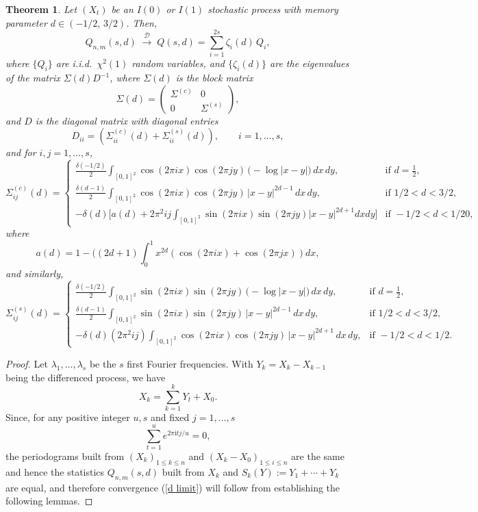 \documentclass[12pt]{article}
\newtheorem{thm}{Theorem}
\def\i{\mathrm{i}}
\begin{document}
 \begin{thm}\label{Th1}
Let $(X_t)$ be an $I(0)$ or $I(1)$ stochastic process with memory parameter $d \in (-1/2,\,3/2)$. Then,
\begin{equation}\label{d limit}
Q_{n,m}(s,d) \;\overset{\mathcal{D}}{\longrightarrow}\;
Q(s,d) = \sum_{i=1}^{2s} \zeta_i(d)\, Q_i, 
\end{equation}
where $\{Q_i\}$ are i.i.d.\ $\chi^2(1)$ random variables, and $\{\zeta_i(d)\}$ are the eigenvalues of the  matrix
$\Sigma(d)D^{-1}$, where $\Sigma(d)$ is the block matrix
\begin{equation}\label{Sigma}
\Sigma(d) =
\begin{pmatrix}
\Sigma^{(c)} & 0\\[3pt]
0 &\Sigma^{(s)}
\end{pmatrix},
\end{equation}
and $D$ is the diagonal matrix with diagonal entries
$$D_{ii} =\left(\Sigma^{(c)}_{ii}(d) + \Sigma^{(s)}_{ii}(d)\right),\qquad i=1,\ldots,s,$$
and for $i,j=1,\ldots,s$, 
\[
\Sigma^{(c)}_{ij}(d) =
\begin{cases}
\displaystyle \frac{\delta(-1/2)}{2}\int_{[0,1]^2}\!\cos(2\pi i x)\cos(2\pi j y)\,
\bigl(-\log|x-y|\bigr)\,dx\,dy,
& \text{if } d=\tfrac{1}{2},\\[10pt]
\displaystyle\frac{\delta(d-1)}{2}\int_{[0,1]^2}\!\cos(2\pi i x)\cos(2\pi j y)\,
|x-y|^{2d-1}\,dx\,dy,
& \text{if } 1/2<d<3/2,\\[10pt]
-\delta(d)\Bigg[a(d)+
2\pi^2 i j\displaystyle\int_{[0,1]^2}\sin(2\pi ix)\sin(2\pi jy)\vert x- y\vert^{2d+1}dxdy\Bigg] 
& \text{if } -1/2<d<1/20,
\end{cases}
\]
where
$$
a(d)=1-((2d+1)\int_0^1x^{2d}\left(\cos(2\pi ix)+\cos(2\pi jx)\right)dx,
$$
and similarly,
\[
\Sigma^{(s)}_{ij}(d) =
\begin{cases}
\displaystyle\frac{\delta(-1/2)}{2} \int_{[0,1]^2}\!\sin(2\pi i x)\sin(2\pi j y)\,
\bigl(-\log|x-y|\bigr)\,dx\,dy,
& \text{if } d=\tfrac{1}{2},\\[10pt]
\frac{\delta(d-1)}{2}\displaystyle\int_{[0,1]^2}\!\sin(2\pi i x)\sin(2\pi j y)\,
|x-y|^{2d-1}\,dx\,dy,
& \text{if } 1/2<d<3/2,\\[10pt]
-\delta(d)(2\pi^2 ij)\displaystyle\int_{[0,1]^2}\!\cos(2\pi i x)\cos(2\pi j y)\,
|x-y|^{2d+1}\,dx\,dy,
& \text{if } -1/2<d<1/2.
\end{cases}
\]
\end{thm}
\begin{proof}
    

Let $\lambda_1,\ldots,\lambda_s$ be the $s$ first  Fourier frequencies. 
With $Y_k=X_k-X_{k-1}$ being the differenced process, we have
$$
X_k=\sum_{k=1}^kY_t+X_0.
$$
Since, for any positive integer $u,s$ and fixed $j=1,\ldots,s$
\begin{equation}\label{sumzero2}
\sum_{t=1}^ue^{2\pi \i tj/u}=0,
\end{equation}
the periodograms built from $(X_k)_{1\le k\le n}$ and $(X_k-X_0)_{1\le i\le n}$ are the same and hence the statistics $Q_{n,m}(s,d)$ built from $X_k$ and $S_k(Y):=Y_1+\cdots+Y_k$ are equal, and therefore
convergence (\ref{d limit}) will follow from establishing the following lemmas.
\end{proof}
\end{document}
